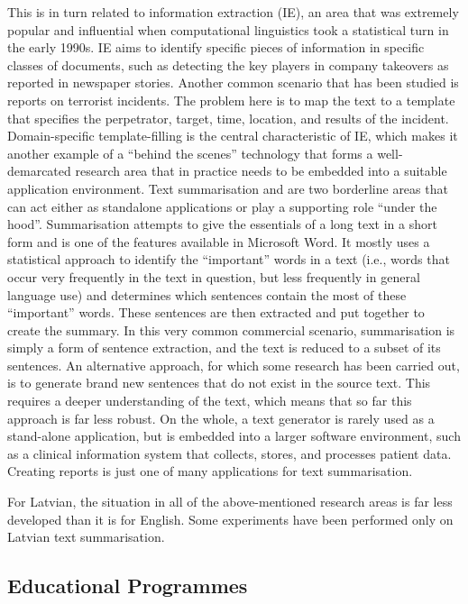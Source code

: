 \begin{multicols}{2}
This is in turn related to information extraction (IE), an area that was extremely popular and influential when computational linguistics took a statistical turn in the early 1990s.
IE aims to identify specific pieces of information in specific classes of documents, such as detecting the key players in company takeovers as reported in newspaper stories.
Another common scenario that has been studied is reports on terrorist incidents.
The problem here is to map the text to a template that specifies the perpetrator, target, time, location, and results of the incident.
Domain-specific template-filling is the central characteristic of IE, which makes it another example of a ``behind the scenes'' technology that forms a well-demarcated research area that in practice needs to be embedded into a suitable application environment. 
Text summarisation and  are two borderline areas that can act either as standalone applications or play a supporting role ``under the hood''.
Summarisation attempts to give the essentials of a long text in a short form and is one of the features available in Microsoft Word.
It mostly uses a statistical approach to identify the ``important'' words in a text (i.e., words that occur very frequently in the text in question, but less frequently in general language use) and determines which sentences contain the most of these ``important'' words.
These sentences are then extracted and put together to create the summary.
In this very common commercial scenario, summarisation is simply a form of sentence extraction, and the text is reduced to a subset of its sentences.
An alternative approach, for which some research has been carried out, is to generate brand new sentences that do not exist in the source text.
This requires a deeper understanding of the text, which means that so far this approach is far less robust.
On the whole, a text generator is rarely used as a stand-alone application, but is embedded into a larger software environment, such as a clinical information system that collects, stores, and processes patient data.
Creating reports is just one of many applications for text summarisation. 

For Latvian, the situation in all of the above-mentioned research areas is far less developed than it is for English.
Some experiments have been performed only on Latvian text summarisation.

\subsection{Educational Programmes}


\end{multicols}
